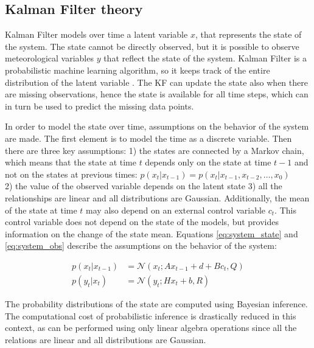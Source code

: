 \documentclass{article}
\newcommand{\norm}[3]{\mathcal{N}\left(#1; #2, #3\right)} %
\let\Oldsubsection\subsection
\renewcommand{\subsection}{\FloatBarrier\Oldsubsection}
\begin{document}
\subsection{Kalman Filter theory}

Kalman Filter models over time a latent variable $x$, that represents the state of the system. The state cannot be directly observed, but it is possible to observe meteorological variables $y$ that reflect the state of the system. 
Kalman Filter is a probabilistic machine learning algorithm, so it keeps track of the entire distribution of the latent variable \cite{bishop_pattern_2006}.
The KF can update the state also when there are missing observations, hence the state is available for all time steps, which can in turn be used to predict the missing data points.

In order to model the state over time, assumptions on the behavior of the system are made. The first element is to model the time as a discrete variable.  Then there are three key assumptions: 1) the states are connected by a Markov chain, which means that the state at time $t$ depends only on the state at time $t-1$ and not on the states at previous times: $p(x_t|x_{t-1}) = p(x_t|x_{t-1}, x_{t-2}, \hdots, x_0)$\\ 2) the value of the observed variable depends on the latent state 3) all the relationships are linear and all distributions are Gaussian. Additionally, the mean of the state at time $t$ may also depend on an external control variable $c_t$. This control variable does not depend on the state of the models, but provides information on the change of the state mean.
Equations \ref{eq:system_state} and \ref{eq:system_obs} describe the assumptions on the behavior of the system:

\begin{align}
p(x_t | x_{t-1}) &= \norm{x_t}{Ax_{t-1} + d + Bc_t}{Q} \label{eq:system_state}\\
p(y_t | x_t) &= \norm{y_t}{Hx_t + b}{R} \label{eq:system_obs}
\end{align}

The probability distributions of the state are computed using Bayesian inference. The computational cost of probabilistic inference is drastically reduced in this context, as can be performed using only linear algebra operations since all the relations are linear and all distributions are Gaussian.
\end{document}
